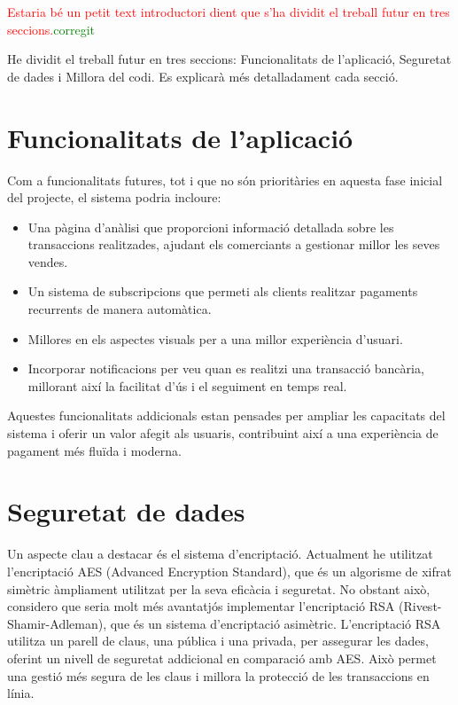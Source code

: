 \documentclass[a4paper,12pt,twoside]{ThesisStyle}
\newcommand{\pau}[1]{\textcolor{red}{#1}}
\newcommand{\sudan}[1]{\textcolor{green}{#1}}
\begin{document}
\pau{Estaria bé un petit text introductori dient que s'ha dividit el treball futur en tres seccions.}\sudan{corregit}

He dividit el treball futur en tres seccions: Funcionalitats de l'aplicació, Seguretat de dades i Millora del codi. Es explicarà més detalladament cada secció.

\section{Funcionalitats de l'aplicació}
\label{sec: Funcionalitats de l'aplicació}

Com a funcionalitats futures, tot i que no són prioritàries en aquesta fase inicial del projecte, el sistema podria incloure:

\begin{itemize}
\item Una pàgina d'anàlisi que proporcioni informació detallada sobre les transaccions realitzades, ajudant els comerciants a gestionar millor les seves vendes.
\item Un sistema de subscripcions que permeti als clients realitzar pagaments recurrents de manera automàtica.
\item Millores en els aspectes visuals per a una millor experiència d'usuari.
\item Incorporar notificacions per veu quan es realitzi una transacció bancària, millorant així la facilitat d'ús i el seguiment en temps real.
\end{itemize}

Aquestes funcionalitats addicionals estan pensades per ampliar les capacitats del sistema i oferir un valor afegit als usuaris, contribuint així a una experiència de pagament més fluïda i moderna.

\section{Seguretat de dades}
\label{sec: Seguretat de dades}

Un aspecte clau a destacar és el sistema d'encriptació. Actualment he utilitzat l'encriptació AES (Advanced Encryption Standard), que és un algorisme de xifrat simètric àmpliament utilitzat per la seva eficàcia i seguretat. No obstant això, considero que seria molt més avantatjós implementar l'encriptació RSA (Rivest-Shamir-Adleman), que és un sistema d'encriptació asimètric. L'encriptació RSA utilitza un parell de claus, una pública i una privada, per assegurar les dades, oferint un nivell de seguretat addicional en comparació amb AES. Això permet una gestió més segura de les claus i millora la protecció de les transaccions en línia.
\end{document}
